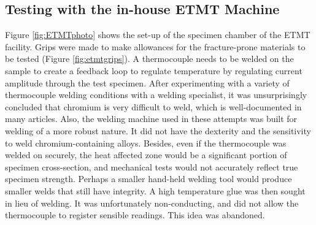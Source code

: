 \subsection{Testing with the in-house ETMT Machine}

Figure \ref{fig:ETMTphoto} shows the set-up of the specimen chamber of the ETMT facility.  Grips were made to make allowances for the fracture-prone materials to be tested (Figure \ref{fig:etmtgrips}).  A thermocouple needs to be welded on the sample to create a feedback loop to regulate temperature by regulating current amplitude through the test specimen.  After experimenting with a variety of thermocouple welding conditions with a welding specialist, it was unsurprisingly concluded that chromium is very difficult to weld, which is well-documented in many articles.  Also, the welding machine used in these attempts was built for welding of a more robust nature.  It did not have the dexterity and the sensitivity to weld chromium-containing alloys. Besides, even if the thermocouple was welded on securely, the heat affected zone would be a significant portion of specimen cross-section, and mechanical tests would not accurately reflect true specimen strength.  Perhaps a smaller hand-held welding tool would produce smaller welds that still have integrity.  A high temperature glue was then sought in lieu of welding.  It was unfortunately non-conducting, and did not allow the thermocouple to register sensible readings.  This idea was abandoned.

